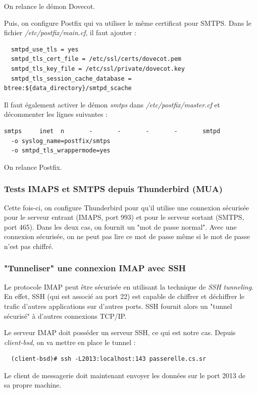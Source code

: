 \documentclass[a4paper]{article}
\begin{document}
On relance le démon Dovecot.

Puis, on configure Postfix qui va utiliser le même certificat pour SMTPS.
Dans le fichier \textit{/etc/postfix/main.cf}, il faut ajouter :
\begin{verbatim}
  smtpd_use_tls = yes
  smtpd_tls_cert_file = /etc/ssl/certs/dovecot.pem
  smtpd_tls_key_file = /etc/ssl/private/dovecot.key
  smtpd_tls_session_cache_database = btree:${data_directory}/smtpd_scache
\end{verbatim}

Il faut également activer le démon \textit{smtps} dans \textit{/etc/postfix/master.cf}
et décommenter les lignes suivantes :
\begin{verbatim}
smtps     inet  n       -       -       -       -       smtpd
  -o syslog_name=postfix/smtps
  -o smtpd_tls_wrappermode=yes
\end{verbatim}

On relance Postfix.

\subsubsection{Tests IMAPS et SMTPS depuis Thunderbird (MUA)}

Cette fois-ci, on configure Thunderbird pour qu'il utilise
une connexion sécurisée pour le serveur entrant (IMAPS, port 993)
et pour le serveur sortant (SMTPS, port 465).
Dans les deux cas, on fournit un "mot de passe normal".
Avec une connexion sécurisée, on ne peut pas lire ce mot de passe même
si le mot de passe n'est pas chiffré.

\subsubsection{"Tunneliser" une connexion IMAP avec SSH}

Le protocole IMAP peut être sécurisée en utilisant la technique
de \textit{SSH tunneling}. En effet, SSH (qui est associé au port 22) est 
capable de chiffrer et déchiffrer le trafic d'autres applications sur
d'autres ports. SSH fournit alors un "tunnel sécurisé" à d'autres
connexions TCP/IP. 

Le serveur IMAP doit posséder un serveur SSH, ce qui est notre cas.
Depuis \textit{client-bsd}, on va mettre en place le tunnel :
\begin{verbatim}
  (client-bsd)# ssh -L2013:localhost:143 passerelle.cs.sr
\end{verbatim}

Le client de messagerie doit maintenant envoyer les données sur le port 2013
de sa propre machine. 
\end{document}
